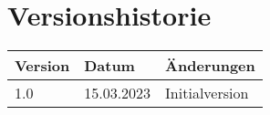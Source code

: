 \section{Versionshistorie}

\begin{table}[ht]
  \centering
  \begin{tabular}{|l|l|l|}
    \hline
    \textbf{Version} & \textbf{Datum} & \textbf{Änderungen} \\ \hline
    1.0              & 15.03.2023     & Initialversion      \\ \hline
  \end{tabular}
\end{table}